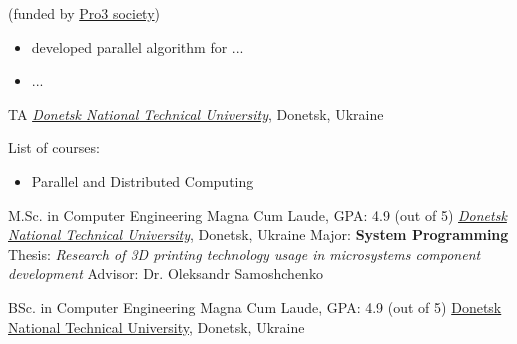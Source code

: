 \documentclass[
  a4paper
]{../FortySecondsCV/fortysecondscv}
\begin{document}
\begin{cvtable}[1]
{          (funded by \href{https://verfahrenstechnik-pro3.de/}{Pro3 society})
          {\footnotesize \setlength\parindent{0pt}\setlength{\parskip}{-1.em}
            \begin{itemize}[leftmargin=*]\setlength\itemsep{-.5em}
            \item 
              developed parallel algorithm for ...
            \item ...
            \end{itemize}
          }
          {\scriptsize
          }
         }
\end{cvtable}


\begin{cvtable}[1]
         {TA}
         {\textit{\href{https://donntu.edu.ua/en/knt-en}{Donetsk National Technical University}}, Donetsk, Ukraine }
         {\setlength\parindent{0pt}\setlength{\parskip}{-1.5em}
           List of courses:%
           \begin{itemize}%
             \setlength\itemsep{-.5em}
           \item Parallel and Distributed Computing
           \end{itemize}
         }
\end{cvtable}

\begin{cvtable}[1.5]
         {M.Sc. in Computer Engineering}
         {Magna Cum Laude, GPA: 4.9 (out of 5)}
         {\href{http://cs.donntu.edu.ua/English/indexEn.php}{\it Donetsk National Technical University}, Donetsk, Ukraine 
           \newline Major: \textbf{System Programming}
           \newline Thesis: \textit{Research of 3D printing technology usage in microsystems component development}
           \newline Advisor: Dr. Oleksandr Samoshchenko
         }

                {BSc. in Computer Engineering}
                {Magna Cum Laude, GPA: 4.9 (out of 5)}
                {\href{http://cs.donntu.edu.ua/English/indexEn.php}{Donetsk National Technical University}, Donetsk, Ukraine}
\end{cvtable}
\end{document}
